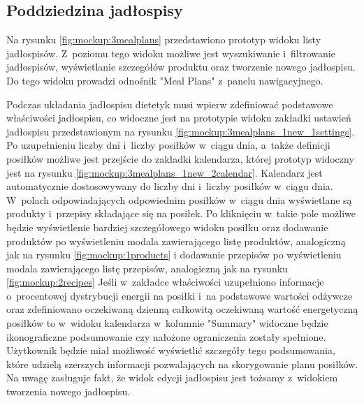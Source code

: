 


\subsection{Poddziedzina jadłospisy}

Na rysunku \ref{fig:mockup:3mealplans} przedstawiono prototyp widoku listy jadłospisów.
Z~poziomu tego widoku możliwe jest wyszukiwanie i~filtrowanie jadłospisów, wyświetlanie szczegółów produktu oraz tworzenie nowego jadłospisu.
Do tego widoku prowadzi odnośnik "Meal Plans" z~panelu nawigacyjnego.


Podczas układania jadłospisu dietetyk musi wpierw zdefiniować podstawowe właściwości jadłospisu, co widoczne jest na prototypie widoku zakładki ustawień jadłospisu przedstawionym na rysunku \ref{fig:mockup:3mealplans_1new_1settings}.
Po uzupełnieniu liczby dni i~liczby posiłków w~ciągu dnia, a~także definicji posiłków możliwe jest przejście do zakładki kalendarza, której prototyp widoczny jest na rysunku \ref{fig:mockup:3mealplans_1new_2calendar}.
Kalendarz jest automatycznie dostosowywany do liczby dni i~liczby posiłków w~ciągu dnia.
W~polach odpowiadających odpowiednim posiłków w~ciągu dnia wyświetlane są produkty i~przepisy składające się na posiłek.
Po kliknięciu w~takie pole możliwe będzie wyświetlenie bardziej szczegółowego widoku posiłku
oraz dodawanie produktów po wyświetleniu modala zawierającego listę produktów, analogiczną jak na rysunku \ref{fig:mockup:1products}
i dodawanie przepisów po wyświetleniu modala zawierającego listę przepisów, analogiczną jak na rysunku \ref{fig:mockup:2recipes}
Jeśli w~zakładce właściwości uzupełniono informacje o~procentowej dystrybucji energii na posiłki i~na podstawowe wartości odżywcze
oraz zdefiniowano oczekiwaną dzienną całkowitą oczekiwaną wartość energetyczną posiłków
to w~widoku kalendarza w~kolumnie "Summary" widoczne będzie ikonograficzne podsumowanie czy nałożone ograniczenia zostały spełnione.
Użytkownik będzie miał możliwość wyświetlić szczegóły tego podsumowania, które udzielą szerszych informacji pozwalających na skorygowanie planu posiłków.
Na uwagę zasługuje fakt, że widok edycji jadłospisu jest tożsamy z~widokiem tworzenia nowego jadłospisu.

